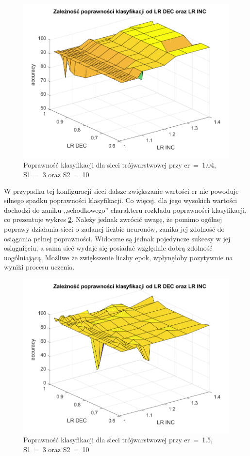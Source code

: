 \documentclass[12pt,twoside]{article}
\begin{document}
\begin{figure}[ht]
	\centering
	\includegraphics[width=16cm]{figures/ErIncDec_3.png}
	\caption{Poprawność klasyfikacji dla sieci trójwarstwowej przy er~=~1.04, S1~=~3 oraz S2~=~10}
	\label{Fig:ErIncDec3}
\end{figure}

W przypadku tej konfiguracji sieci dalsze zwiększanie wartości er nie powoduje silnego spadku poprawności klasyfikacji.
Co więcej, dla jego wysokich wartości dochodzi do zaniku ,,schodkowego'' charakteru rozkładu poprawności klasyfikacji, co prezentuje wykres \ref{Fig:ErIncDec4}.
Należy jednak zwrócić uwagę, że pomimo ogólnej poprawy działania sieci o zadanej liczbie neuronów, zanika jej zdolność do osiągania pełnej poprawności.
Widoczne są jednak pojedyncze sukcesy w jej osiągnięciu, a sama sieć wydaje się posiadać względnie dobrą zdolność uogólniającą.
Możliwe że zwiększenie liczby epok, wpłynęłoby pozytywnie na wyniki procesu uczenia.

\begin{figure}[ht]
	\centering
	\includegraphics[width=16cm]{figures/ErIncDec_4.png}
	\caption{Poprawność klasyfikacji dla sieci trójwarstwowej przy er~=~1.5, S1~=~3 oraz S2~=~10}
	\label{Fig:ErIncDec4}
\end{figure}
\end{document}
